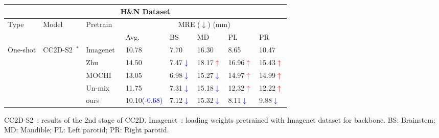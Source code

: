 \documentclass[10pt,twocolumn,letterpaper]{article}
\begin{document}
\begin{table*}[t]
\begin{threeparttable}
\begin{tabular}{l|l|l|lllll}
\hline
\multicolumn{8}{c}{H\&N Dataset} \\ 
\hline
 \multirow{2}{*}{Type} & \multirow{2}{*}{Model} & \multirow{2}{*}{Pretrain} & \multicolumn{5}{c}{MRE ($\downarrow$) (mm)} \\
 \cline{4-8}
  &  & & Avg. & BS & MD & PL & PR \\ 
  \hline
  \multirow{2}{*}{One-shot} & \multirow{2}{*}{CC2D-S2~\cite{yao2021one}$^*$} & Imagenet~\cite{DBLP:conf/cvpr/DengDSLL009} & 10.78 & 7.70 &	16.30 &	8.65 & 10.47 \\
  &  & Zhu~\cite{zhu2021improving}     & 14.50 & 7.47\textcolor{blue}{$\downarrow$} &	18.17\textcolor{red}{$\uparrow$} &	16.96\textcolor{red}{$\uparrow$} & 15.43\textcolor{red}{$\uparrow$} \\
  &  & MOCHI~\cite{kalantidis2020hard} & 13.05 & 6.98\textcolor{blue}{$\downarrow$} &	15.27\textcolor{blue}{$\downarrow$} &	14.97\textcolor{red}{$\uparrow$} & 14.99\textcolor{red}{$\uparrow$} \\
  &  & Un-mix~\cite{shen2022mix}       & 11.75 & 7.31\textcolor{blue}{$\downarrow$} &	15.18\textcolor{blue}{$\downarrow$} &	12.32\textcolor{red}{$\uparrow$} & 12.22\textcolor{red}{$\uparrow$} \\
  & & ours & 10.10\textcolor{blue}{(-0.68)} & 7.12\textcolor{blue}{$\downarrow$} &	15.32\textcolor{blue}{$\downarrow$} &	8.11\textcolor{blue}{$\downarrow$} &	9.88\textcolor{blue}{$\downarrow$} \\
  \hline
\end{tabular}
\begin{tablenotes}
    \footnotesize
    \item[] CC2D-S2~\cite{yao2021one}: results of the 2nd stage of CC2D. Imagenet~\cite{DBLP:conf/cvpr/DengDSLL009}: loading weights pretrained with Imagenet dataset for backbone. BS: Brainstem; MD: Mandible; PL: Left parotid; PR: Right parotid. 
\end{tablenotes}

\end{threeparttable}
\label{table:main}
\end{table*}
\end{document}
